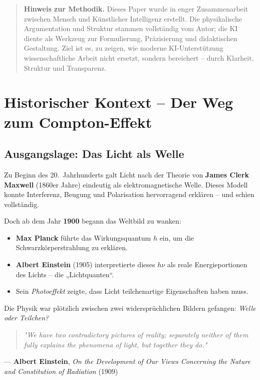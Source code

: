 \documentclass[12pt,oneside]{scrartcl}
\begin{document}
	\vspace{1.2em}
	\begin{quote}
		\small
		\textbf{Hinweis zur Methodik.}  
		Dieses Paper wurde in enger Zusammenarbeit zwischen Mensch und Künstlicher Intelligenz erstellt. 
		Die physikalische Argumentation und Struktur stammen vollständig vom Autor; die KI diente als Werkzeug zur Formulierung, Präzisierung und didaktischen Gestaltung. 
		Ziel ist es, zu zeigen, wie moderne KI-Unterstützung wissenschaftliche Arbeit nicht ersetzt, sondern bereichert – durch Klarheit, Struktur und Transparenz.
	\end{quote}
	\vspace{1.2em}
	

\section{Historischer Kontext – Der Weg zum Compton-Effekt}

\subsection{Ausgangslage: Das Licht als Welle}

Zu Beginn des 20.~Jahrhunderts galt Licht nach der Theorie von \textbf{James Clerk Maxwell} (1860er Jahre) eindeutig als elektromagnetische Welle. 
Dieses Modell konnte Interferenz, Beugung und Polarisation hervorragend erklären – und schien vollständig.

Doch ab dem Jahr \textbf{1900} begann das Weltbild zu wanken:

\begin{itemize}
	\item \textbf{Max Planck} führte das Wirkungsquantum \( h \) ein, um die Schwarzkörperstrahlung zu erklären.
	\item \textbf{Albert Einstein} (1905) interpretierte dieses \( h\nu \) als reale Energieportionen des Lichts – die „Lichtquanten“.
	\item Sein \emph{Photoeffekt} zeigte, dass Licht teilchenartige Eigenschaften haben muss.
\end{itemize}

Die Physik war plötzlich zwischen zwei widersprüchlichen Bildern gefangen: 
\emph{Welle oder Teilchen?}
\vspace{1em}
\begin{HistoryBox}
	\begin{quote}
		\emph{"We have two contradictory pictures of reality; separately neither of them fully explains the phenomena of light, but together they do."}
	\end{quote}
	
	\hfill --- \textbf{Albert Einstein}, \emph{On the Development of Our Views Concerning the Nature and Constitution of Radiation} (1909)
	\label{box:Einstein1909}
\end{HistoryBox}
\end{document}
